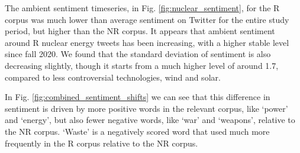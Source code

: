 The ambient sentiment timeseries, in Fig. \ref{fig:nuclear_sentiment},
for the R  corpus was much lower than average sentiment on Twitter for the entire study period,
but higher than the NR corpus.
It appears that ambient sentiment around R nuclear energy tweets has been increasing, with a higher stable level since fall 2020. 
We found that the standard deviation of sentiment is also decreasing slightly,
though it starts from a much higher level of around 1.7, compared to less controversial technologies, wind and solar.

In Fig. \ref{fig:combined_sentiment_shifts} we can see that this difference in sentiment is driven by more positive words in the relevant corpus,
like `power' and `energy',
but also fewer negative words,
like `war' and `weapons', relative to the NR corpus.
`Waste' is a negatively scored word that used much more frequently in the R corpus relative to the NR corpus.




